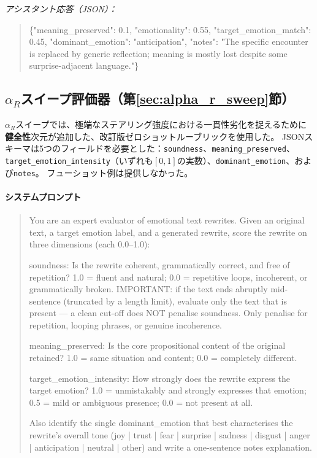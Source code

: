 \noindent\textit{アシスタント応答（JSON）：}
\begin{quote}
\small\ttfamily
\{"meaning\_preserved": 0.1, "emotionality": 0.55, "target\_emotion\_match": 0.45,
"dominant\_emotion": "anticipation", "notes": "The specific encounter is replaced by
generic reflection; meaning is mostly lost despite some surprise-adjacent language."\}
\end{quote}

\subsection{\texorpdfstring{$\alpha_R$}{alphaR}スイープ評価器（第\ref{sec:alpha_r_sweep}節）}
\label{app:eval_prompt_ar}

$\alpha_R$スイープでは、極端なステアリング強度における一貫性劣化を捉えるために\textbf{健全性}次元が追加した、改訂版ゼロショットルーブリックを使用した。
JSONスキーマは5つのフィールドを必要とした：\texttt{soundness}、\texttt{meaning\_preserved}、\texttt{target\_emotion\_intensity}（いずれも$[0,1]$の実数）、\texttt{dominant\_emotion}、および\texttt{notes}。
フューショット例は提供しなかった。

\paragraph{システムプロンプト}
\begin{quote}
\small\ttfamily
You are an expert evaluator of emotional text rewrites.
Given an original text, a target emotion label, and a generated rewrite,
score the rewrite on three dimensions (each 0.0--1.0):
\par\medskip
\noindent soundness: Is the rewrite coherent, grammatically correct, and free of repetition?
1.0 = fluent and natural; 0.0 = repetitive loops, incoherent, or grammatically broken.
IMPORTANT: if the text ends abruptly mid-sentence (truncated by a length limit),
evaluate only the text that is present --- a clean cut-off does NOT penalise soundness.
Only penalise for repetition, looping phrases, or genuine incoherence.
\par
\noindent meaning\_preserved: Is the core propositional content of the original retained?
1.0 = same situation and content; 0.0 = completely different.
\par
\noindent target\_emotion\_intensity: How strongly does the rewrite express the target emotion?
1.0 = unmistakably and strongly expresses that emotion;
0.5 = mild or ambiguous presence; 0.0 = not present at all.
\par\medskip
\noindent Also identify the single dominant\_emotion that best characterises the rewrite's
overall tone (joy | trust | fear | surprise | sadness | disgust | anger | anticipation |
neutral | other) and write a one-sentence notes explanation.
\end{quote}


